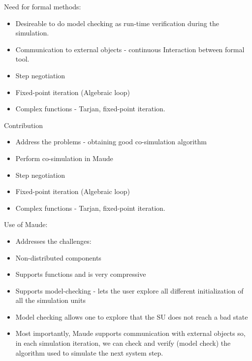   Need for formal methods:
  \begin{itemize}
    \item Desireable to do model checking as run-time verification during the simulation.
    \item Communication to external objects - continuous Interaction between formal tool.
    \item Step negotiation
    \item Fixed-point iteration (Algebraic loop)
    \item Complex functions - Tarjan, fixed-point iteration.
  \end{itemize}
  
  Contribution
  \begin{itemize}
    \item Address the problems - obtaining good co-simulation algorithm
    \item Perform co-simulation in Maude
    \item Step negotiation
    \item Fixed-point iteration (Algebraic loop)
    \item Complex functions - Tarjan, fixed-point iteration.
  \end{itemize}
  
  Use of Maude:
  \begin{itemize}
    \item Addresses the challenges:
    \item Non-distributed components
    \item Supports functions and is very compressive
    \item Supports model-checking - lets the user explore all different initialization of all the simulation units
    \item Model checking allows one to explore that the SU does not reach a bad state
    \item Most importantly, Maude supports communication with external objects so, in each simulation iteration, we can check and verify (model check) the algorithm used to simulate the next system step.
  \end{itemize}
  
